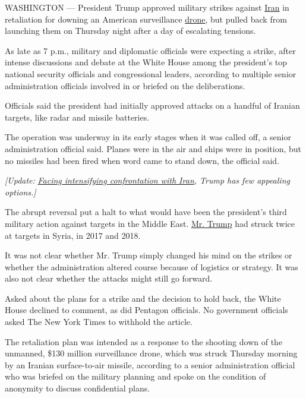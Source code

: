 WASHINGTON --- President Trump approved military strikes against
\href{https://www.nytimes.com/2019/07/12/us/politics/trump-iran-vote.html}{Iran}
in retaliation for downing an American surveillance
\href{https://www.nytimes.com/2019/07/18/us/politics/iranian-drone-shot-down.html}{drone},
but pulled back from launching them on Thursday night after a day of
escalating tensions.

As late as 7 p.m., military and diplomatic officials were expecting a
strike, after intense discussions and debate at the White House among
the president's top national security officials and congressional
leaders, according to multiple senior administration officials involved
in or briefed on the deliberations.

Officials said the president had initially approved attacks on a handful
of Iranian targets, like radar and missile batteries.

The operation was underway in its early stages when it was called off, a
senior administration official said. Planes were in the air and ships
were in position, but no missiles had been fired when word came to stand
down, the official said.

\emph{{[}Update:}
\href{https://www.nytimes.com/2019/06/22/world/middleeast/trump-iran.html}{\emph{Facing
intensifying confrontation with Iran}}\emph{, Trump has few appealing
options.{]}}

The abrupt reversal put a halt to what would have been the president's
third military action against targets in the Middle East.
\href{https://www.nytimes.com/2019/07/12/us/politics/trump-iran-vote.html}{Mr.
Trump} had struck twice at targets in Syria, in 2017 and 2018.

It was not clear whether Mr. Trump simply changed his mind on the
strikes or whether the administration altered course because of
logistics or strategy. It was also not clear whether the attacks might
still go forward.

Asked about the plans for a strike and the decision to hold back, the
White House declined to comment, as did Pentagon officials. No
government officials asked The New York Times to withhold the article.

The retaliation plan was intended as a response to the shooting down of
the unmanned, \$130 million surveillance drone, which was struck
Thursday morning by an Iranian surface-to-air missile, according to a
senior administration official who was briefed on the military planning
and spoke on the condition of anonymity to discuss confidential plans.

